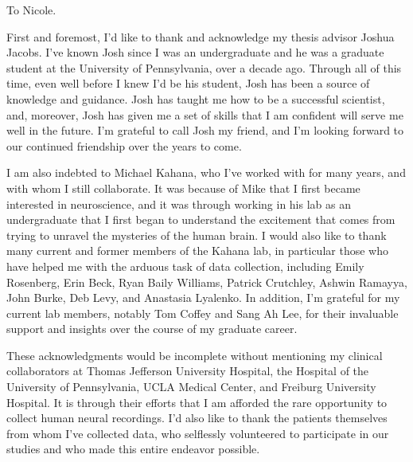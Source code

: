 \begin{preamble}

\iffinal{}{\newpage}

\begin{DUTdedications}
\begin{center}
To Nicole.
\end{center}
\end{DUTdedications}

\iffinal{}{\newpage}

\begin{acknowledgments}
First and foremost, I'd like to thank and acknowledge my thesis advisor Joshua Jacobs. I've known Josh since I was an undergraduate and he was a graduate student at the University of Pennsylvania, over a decade ago. Through all of this time, even well before I knew I'd be his student, Josh has been a source of knowledge and guidance. Josh has taught me how to be a successful scientist, and, moreover, Josh has given me a set of skills that I am confident will serve me well in the future. I'm grateful to call Josh my friend, and I'm looking forward to our continued friendship over the years to come.

I am also indebted to Michael Kahana, who I've worked with for many years, and with whom I still collaborate. It was because of Mike that I first became interested in neuroscience, and it was through working in his lab as an undergraduate that I first began to understand the excitement that comes from trying to unravel the mysteries of the human brain. I would also like to thank many current and former members of the Kahana lab, in particular those who have helped me with the arduous task of data collection, including Emily Rosenberg, Erin Beck, Ryan Baily Williams, Patrick Crutchley, Ashwin Ramayya, John Burke, Deb Levy, and Anastasia Lyalenko. In addition, I'm grateful for my current lab members, notably Tom Coffey and Sang Ah Lee, for their invaluable support and insights over the course of my graduate career.

These acknowledgments would be incomplete without mentioning my clinical collaborators at Thomas Jefferson University Hospital, the Hospital of the University of Pennsylvania, UCLA Medical Center, and Freiburg University Hospital. It is through their efforts that I am afforded the rare opportunity to collect human neural recordings. I'd also like to thank the patients themselves from whom I've collected data, who selflessly volunteered to participate in our studies and who made this entire endeavor possible.


\end{acknowledgments}
\end{preamble}
